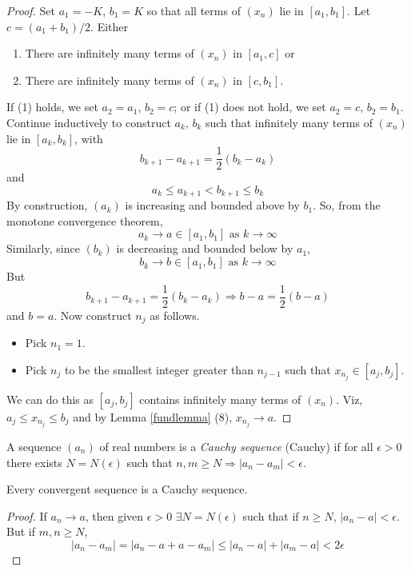 \documentclass[10pt, a4paper, twoside]{report}
\begin{document}
\begin{proof}
    Set \(a_1=-K\), \(b_1=K\) so that all terms of \((x_n)\) lie in \([a_1,b_1]\). Let \(c=(a_1+b_1)/2\). Either
    \begin{enumerate}
        \item There are infinitely many terms of \((x_n)\) in \([a_1,c]\) or 
        \item There are infinitely many terms of \((x_n)\) in \([c,b_1]\).
    \end{enumerate}
    If (1) holds, we set \(a_2=a_1\), \(b_2=c\); or if (1) does not hold, we set \(a_2=c\), \(b_2=b_1\). Continue inductively to construct \(a_k\), \(b_k\) such that infinitely many terms of \((x_n)\) lie in \([a_k,b_k]\), with
    \[b_{k+1}-a_{k+1}=\frac 12(b_k-a_k)\]
    and 
    \[a_k\leq a_{k+1}<b_{k+1}\leq b_k\]
    By construction, \((a_k)\) is increasing and bounded above by \(b_1\). So, from the monotone convergence theorem,
    \[a_k\to a\in[a_1,b_1]\text{  as  }k\to\infty\]
    Similarly, since \((b_k)\) is decreasing and bounded below by \(a_1\),
    \[b_k\to b\in[a_1,b_1]\text{  as  }k\to\infty\]
    But
    \[b_{k+1}-a_{k+1}=\frac 12(b_k-a_k)\Rightarrow b-a=\frac 12(b-a)\]
    and \(b=a\). Now construct \(n_j\) as follows.
    \begin{itemize}
        \item Pick \(n_1=1\).
        \item Pick \(n_j\) to be the smallest integer greater than \(n_{j-1}\) such that \(x_{n_j}\in[a_j,b_j]\).
    \end{itemize}
    We can do this as \([a_j,b_j]\) contains infinitely many terms of \((x_n)\). Viz, \(a_j\leq x_{n_j}\leq b_j\) and by Lemma \ref{fundlemma} (8), \(x_{n_j}\to a\).
\end{proof}
\begin{definition}
    A sequence \((a_n)\) of real numbers is a \emph{Cauchy sequence} (Cauchy) if for all \(\epsilon>0\) there exists \(N=N(\epsilon)\) such that \(n,m\geq N\Rightarrow|a_n-a_m|<\epsilon\).
\end{definition}
\begin{lemma}
    Every convergent sequence is a Cauchy sequence.
    \label{lemma:conv_cauchy}
\end{lemma}
\begin{proof}
    If \(a_n\to a\), then given \(\epsilon>0\) \(\exists N=N(\epsilon)\) such that if \(n\geq N\), \(|a_n-a|<\epsilon\). But if \(m,n\geq N\),
    \[|a_n-a_m|=|a_n-a+a-a_m|\leq |a_n-a|+|a_m-a|<2\epsilon\]
\end{proof}
\end{document}
